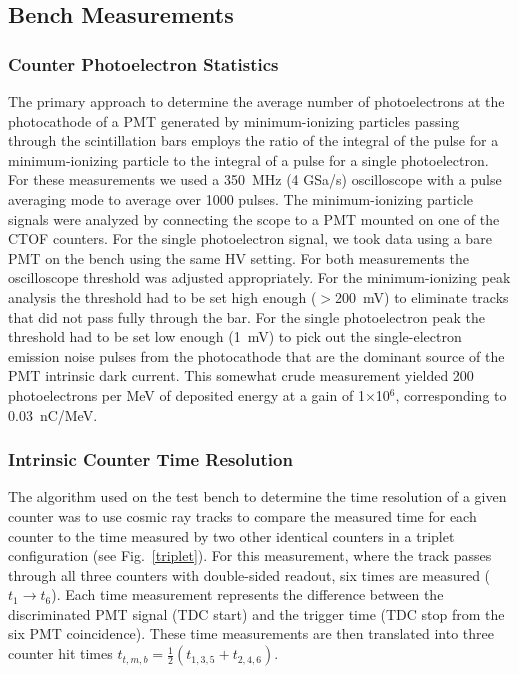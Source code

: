 \documentclass[3p,times,twocolumn]{elsarticle}
\begin{document}
\subsection{Bench Measurements}
\label{sec:bench}

\subsubsection{Counter Photoelectron Statistics}
\label{sec:npe}

The primary approach to determine the average number of photoelectrons at the photocathode of a PMT
generated by minimum-ionizing particles passing through the scintillation bars employs the ratio of the
integral of the pulse for a minimum-ionizing particle to the integral of a pulse for a single photoelectron.
For these measurements we used a 350~MHz (4 GSa/s) oscilloscope with a pulse averaging mode to average
over 1000 pulses. The minimum-ionizing particle signals were analyzed by connecting the scope to a PMT
mounted on one of the CTOF counters. For the single photoelectron signal, we took data using a bare PMT
on the bench using the same HV setting. For both measurements the oscilloscope threshold was adjusted
appropriately. For the minimum-ionizing peak analysis the threshold had to be set high enough ($>$200~mV)
to eliminate tracks that did not pass fully through the bar. For the single photoelectron peak the threshold
had to be set low enough (1~mV) to pick out the single-electron emission noise pulses from the photocathode
that are the dominant source of the PMT intrinsic dark current. This somewhat crude measurement yielded
200 photoelectrons per MeV of deposited energy at a gain of 1$\times$10$^6$, corresponding to
0.03~nC/MeV.

\subsubsection{Intrinsic Counter Time Resolution}
\label{sec-bench}

The algorithm used on the test bench to determine the time resolution of a given counter was to use cosmic
ray tracks to compare the measured time for each counter to the time measured by two other identical
counters in a triplet configuration (see Fig.~\ref{triplet}). For this measurement, where the track passes
through all three counters with double-sided readout, six times are measured ($t_1 \to t_6$). Each time
measurement represents the difference between the discriminated PMT signal (TDC start) and the trigger
time (TDC stop from the six PMT coincidence). These time measurements are then translated into three
counter hit times $t_{t,m,b} = \frac{1}{2}(t_{1,3,5} + t_{2,4,6})$.
\end{document}
